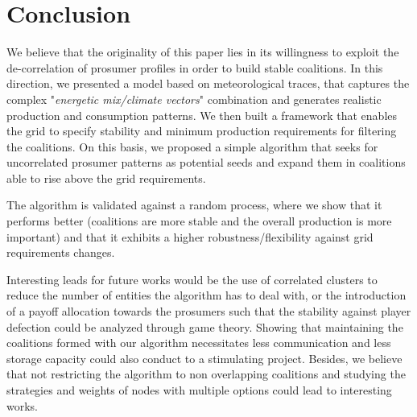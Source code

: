 \documentclass[conference]{IEEEtran}
\begin{document}
%
%
\section{Conclusion}
\label{sec:conclusion}

We believe that the originality of this paper lies in its willingness to exploit the de-correlation of prosumer profiles in order to build stable coalitions. In this direction, we presented a model based on meteorological traces, that captures the complex "\textit{energetic mix/climate vectors}" combination and generates realistic production and consumption patterns. We then built a framework that enables the grid to specify stability and minimum production requirements for filtering the coalitions. On this basis, we proposed a simple algorithm that seeks for uncorrelated prosumer patterns as potential seeds and expand them in coalitions able to rise above the grid requirements.

The algorithm is validated against a random process, where we show that it performs better (coalitions are more stable and the overall production is more important) and that it exhibits a higher robustness/flexibility against grid requirements changes.

Interesting leads for future works would be the use of correlated clusters to reduce the number of entities the algorithm has to deal with, or the introduction of a payoff allocation towards the prosumers such that the stability against player defection could be analyzed through game theory. Showing that maintaining the coalitions formed with our algorithm necessitates less communication and less storage capacity could also conduct to a stimulating project. Besides, we believe that not restricting the algorithm to non overlapping coalitions and studying the strategies and weights of nodes with multiple options could lead to interesting works.



%
%
 
  

\end{document}

